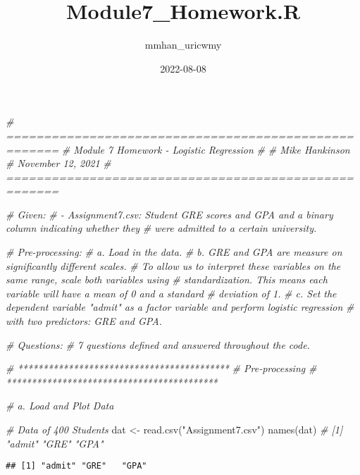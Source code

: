 \documentclass[
]{article}
\title{Module7\_Homework.R}
\author{mmhan\_uricwmy}
\date{2022-08-08}
\newenvironment{Shaded}{\begin{snugshade}}{\end{snugshade}}
\newcommand{\CommentTok}[1]{\textcolor[rgb]{0.56,0.35,0.01}{\textit{#1}}}
\newcommand{\FunctionTok}[1]{\textcolor[rgb]{0.00,0.00,0.00}{#1}}
\newcommand{\NormalTok}[1]{#1}
\newcommand{\OtherTok}[1]{\textcolor[rgb]{0.56,0.35,0.01}{#1}}
\newcommand{\StringTok}[1]{\textcolor[rgb]{0.31,0.60,0.02}{#1}}
\begin{document}
\maketitle

\begin{Shaded}
\begin{Highlighting}[]
\CommentTok{\# =====================================================}
\CommentTok{\# Module 7 Homework {-} Logistic Regression}
\CommentTok{\#                     }
\CommentTok{\# Mike Hankinson}
\CommentTok{\# November 12, 2021}
\CommentTok{\# =====================================================}

\CommentTok{\# Given: }
\CommentTok{\# {-} Assignment7.csv: Student GRE scores and GPA and a binary column indicating whether they }
\CommentTok{\#   were admitted to a certain university. }

\CommentTok{\# Pre{-}processing:}
\CommentTok{\# a.    Load in the data. }
\CommentTok{\# b.    GRE and GPA are measure on significantly different scales. }
\CommentTok{\#     To allow us to interpret these variables on the same range, scale both variables using }
\CommentTok{\#     standardization. This means each variable will have a mean of 0 and a standard }
\CommentTok{\#     deviation of 1. }
\CommentTok{\# c.    Set the dependent variable "admit" as a factor variable and perform logistic regression }
\CommentTok{\#     with two predictors: GRE and GPA. }

\CommentTok{\# Questions: }
\CommentTok{\# 7 questions defined and answered throughout the code. }


\CommentTok{\# ******************************************}
\CommentTok{\# Pre{-}processing }
\CommentTok{\# ******************************************}

\CommentTok{\# a. Load and Plot Data}
\end{Highlighting}
\end{Shaded}

\begin{Shaded}
\begin{Highlighting}[]
\CommentTok{\# Data of 400 Students}
\NormalTok{dat }\OtherTok{\textless{}{-}} \FunctionTok{read.csv}\NormalTok{(}\StringTok{"Assignment7.csv"}\NormalTok{)}
\FunctionTok{names}\NormalTok{(dat)      }\CommentTok{\# [1] "admit" "GRE"   "GPA"}
\end{Highlighting}
\end{Shaded}

\begin{verbatim}
## [1] "admit" "GRE"   "GPA"
\end{verbatim}
\end{document}
